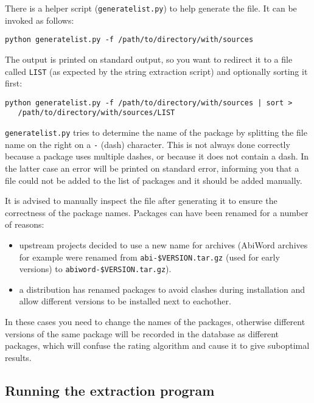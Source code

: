 \documentclass[10pt]{article}
\begin{document}
There is a helper script (\texttt{generatelist.py}) to help generate the file.
It can be invoked as follows:

\begin{verbatim}
python generatelist.py -f /path/to/directory/with/sources
\end{verbatim}

The output is printed on standard output, so you want to redirect it to a file
called \texttt{LIST} (as expected by the string extraction script) and
optionally sorting it first:

\begin{verbatim}
python generatelist.py -f /path/to/directory/with/sources | sort >
   /path/to/directory/with/sources/LIST
\end{verbatim}


\texttt{generatelist.py} tries to determine the name of the package by
splitting the file name on the right on a \texttt{-} (dash)
character. This is not always done correctly because a package uses multiple
dashes, or because it does not contain a dash. In the latter case an error
will be printed on standard error, informing you that a file could not be
added to the list of packages and it should be added manually.

It is advised to manually inspect the file after generating it to ensure the
correctness of the package names. Packages can have been renamed for a number
of reasons:

\begin{itemize}
\item upstream projects decided to use a new name for archives (AbiWord
archives for example were renamed from \texttt{abi-\$VERSION.tar.gz} (used for
early versions) to \texttt{abiword-\$VERSION.tar.gz}).
\item a distribution has renamed packages to avoid clashes during installation
and allow different versions to be installed next to eachother.
\end{itemize}

In these cases you need to change the names of the packages, otherwise
different versions of the same package will be recorded in the database as
different packages, which will confuse the rating algorithm and cause it to
give suboptimal results.


\subsection{Running the extraction program}
\end{document}
